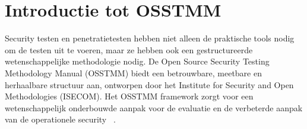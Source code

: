 

\section{Introductie tot OSSTMM}

Security testen en penetratietesten hebben niet alleen de praktische tools nodig om de testen uit te voeren, maar ze hebben ook een gestructureerde wetenschappelijke methodologie nodig.
De Open Source Security Testing Methodology Manual (OSSTMM) biedt een betrouwbare, meetbare en herhaalbare structuur aan, ontworpen door het Institute for Security and Open Methodologies (ISECOM).
Het OSSTMM framework zorgt voor een wetenschappelijk onderbouwde aanpak voor de evaluatie en de verbeterde aanpak van de operationele security ~\autocite{Herzog}.

